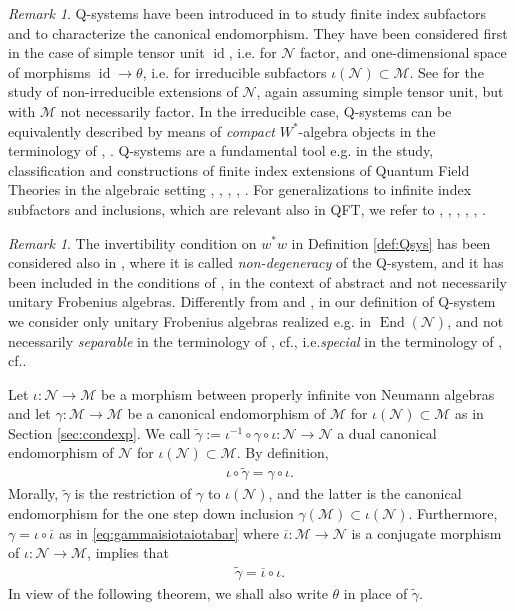 \documentclass[11pt,a4paper]{article}
\makeatletter
\newcommand{\iotabar}{{\overline{\iota}}}
\newcommand{\M}{\mathcal{M}}
\newcommand{\N}{\mathcal{N}}
\DeclareMathOperator{\End}{End}
\DeclareMathOperator{\id}{id}
\DeclareRobustCommand{\eg}{e.g.\@\xspace}
\DeclareRobustCommand{\cf}{cf.\@\xspace}
\DeclareRobustCommand{\ie}{i.e.\@\xspace}
\DeclareRobustCommand{\Sec}{Sec.\@\xspace}
\DeclareRobustCommand{\Thm}{Thm.\@\xspace}
\DeclareRobustCommand{\Ch}{Ch.\@\xspace}
\DeclareRobustCommand{\Def}{Def.\@\xspace}
\newcommand{\Wstar}{$W^\ast$\@\xspace}
\theoremstyle{plain}
\theoremstyle{definition}
\theoremstyle{remark}
\newtheorem{rmk}[thm]{Remark}
\numberwithin{equation}{section}%
\makeatother
\begin{document}
\begin{rmk}
Q-systems have been introduced in \cite{Lon94} to study finite index subfactors and to characterize the canonical endomorphism.
They have been considered first in the case of simple tensor unit $\id$, \ie for $\N$ factor, and one-dimensional space of morphisms $\id\to \theta$, \ie for irreducible subfactors $\iota(\N)\subset\M$. See \cite[\Ch 3]{BKLR15} for the study of non-irreducible extensions of $\N$, again assuming simple tensor unit, but with $\M$ not necessarily factor. In the irreducible case, Q-systems can be equivalently described by means of \emph{compact} \Wstar-algebra objects in the terminology of \cite{JoPe17}, \cite[\Sec 2.4]{JoPe20}. Q-systems are a fundamental tool \eg in the study, classification and constructions of finite index extensions of Quantum Field Theories in the algebraic setting \cite{LoRe95}, \cite{LoRe04}, \cite{KaLo04}, \cite{BKL15}, \cite{BKLR16}. For generalizations to infinite index subfactors and inclusions, which are relevant also in QFT, we refer to \cite{FiIs99}, \cite{DVGi18}, \cite{JoPe19}, \cite{BDG21}, \cite{BDG21-online}, \cite{BDG22}.
\end{rmk}

\begin{rmk}\label{rmk:invertcond}
The invertibility condition on $w^*w$ in Definition \ref{def:Qsys} has been considered also in \cite[\Def 3.3]{CHPJP21}, where it is called \emph{non-degeneracy} of the Q-system, and it has been included in the conditions of \cite[\Thm 3.11]{Mue03-I}, in the context of abstract and not necessarily unitary Frobenius algebras.
 Differently from \cite{CHPJP21} and \cite{BKLR15}, in our definition of Q-system we consider only unitary Frobenius algebras realized \eg in $\End(\N)$, and not necessarily \emph{separable} in the terminology of \cite[\Def 3.1]{CHPJP21}, \cf \cite[\Def 3.13]{Mue03-I}, \ie \emph{special} in the terminology of \cite[\Def 2.14]{GiYu20}, \cf \cite[\Def 3.2]{BKLR15}. 
\end{rmk}

Let $\iota:\N\to\M$ be a morphism between properly infinite von Neumann algebras and let $\gamma : \M \to \M$ be a canonical endomorphism of $\M$ for $\iota(\N) \subset \M$ as in Section \ref{sec:condexp}. We call $\widetilde\gamma := \iota^{-1} \circ \gamma \circ \iota : \N \to \N$ a dual canonical endomorphism of $\N$ for $\iota(\N) \subset \M$. By definition,
\begin{align}
\iota \circ \widetilde\gamma = \gamma \circ \iota.
\end{align}
Morally, $\widetilde\gamma$ is the restriction of $\gamma$ to $\iota(\N)$, and the latter is the canonical endomorphism for the one step down inclusion $\gamma(\M) \subset \iota(\N)$. Furthermore, $\gamma = \iota \circ \iotabar$ as in \eqref{eq:gammaisiotaiotabar} where $\iotabar: \M \to \N$ is a conjugate morphism of $\iota:\N\to\M$, implies that
\begin{align}\label{eq:thetaisiotabariota}
\widetilde\gamma = \iotabar \circ \iota.
\end{align}
In view of the following theorem, we shall also write $\theta$ in place of $\widetilde\gamma$.
\end{document}
